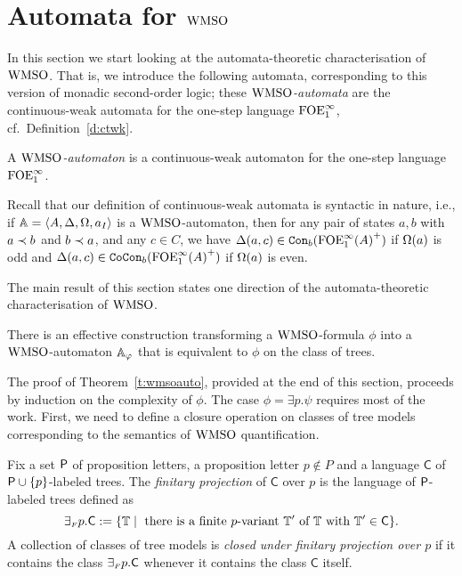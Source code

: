 
\section{Automata for $\wmso$}
   \label{sec:autwmso}

In this section we start looking at the automata-theoretic characterisation of
$\wmso$.
That is, we introduce the following automata, corresponding to this version of
monadic second-order logic; these \emph{$\wmso$-automata} are the continuous-weak
automata for the one-step language $\ofoei$, cf.~Definition~\ref{d:ctwk}.

\begin{definition}
A \emph{$\wmso$-automaton} is a continuous-weak automaton for the one-step
language $\ofoei$.
\end{definition}

Recall that our definition of continuous-weak automata is syntactic in nature,
i.e., if $\bbA = \tup{A,\tmap,\pmap,a_I}$ is a $\wmso$-automaton, then for any
pair of states $a,b$ with $a \ord b$ and $b \ord a$, and any $c\in C$, we have
$\tmap(a,c) \in \cont{{\ofoei(A)}^+}{b}$ if $\pmap(a)$ is odd and $\tmap(a,c)
\in \cocont{{\ofoei(A)}^+}{b}$ if $\pmap(a)$ is even.

The main result of this section states one direction of the automata-theoretic
characterisation of $\wmso$.

\begin{theorem}
\label{t:wmsoauto}
There is an effective construction transforming a $\wmso$-formula $\phi$
into a $\wmso$-automaton $\bbA_{\phi}$ that is equivalent
to $\phi$ on the class of trees.
\end{theorem}

{\color{blue} 
The proof of Theorem~\ref{t:wmsoauto}, provided at the end of this section, 
proceeds by induction on the complexity of $\phi$. 
The case $\phi = \exists p. \psi$ requires most of the work.
First, we need to define a closure operation on classes of tree models 
corresponding to the semantics of $\wmso$ quantification.
}

\begin{definition}\label{def:tree_finproj-w}
Fix a set $\pprop$ of proposition letters, a proposition letter $p \not\in P$ 
and a language $\mathsf{C}$ of $\pprop\cup\{p\}$-labeled trees.
The \emph{finitary projection} of $\mathsf{C}$ over $p$ is the language of 
$\pprop$-labeled trees defined as 
\[
{\finexists} p.\mathsf{C} \df \{\bbT \mid
\text{ there is a finite $p$-variant } \bbT' \text{ of } \bbT \text{ with }
\bbT' \in \mathsf{C}\}.
\]
%
A collection of classes of tree models is \emph{closed under finitary 
projection over $p$} if it contains the class ${{\finexists} p}.\mathsf{C}$ 
whenever it contains the class $\mathsf{C}$ itself.
\end{definition}

